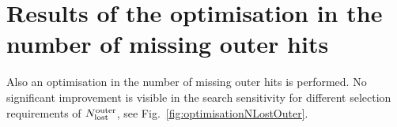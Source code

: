\FloatBarrier
\section{Results of the optimisation in the number of missing outer hits}
\label{app:OptimisationNLostOuter}

Also an optimisation in the number of missing outer hits is performed. 
No significant improvement is visible in the search sensitivity for different selection requirements of $N_{\text{lost}}^{\text{outer}}$, see Fig.~\ref{fig:optimisationNLostOuter}.  

